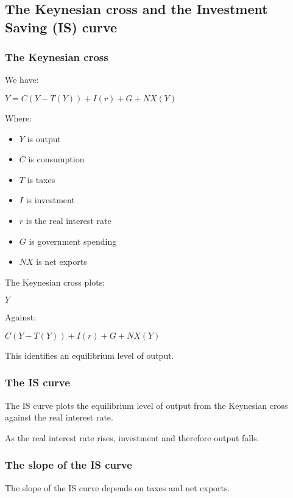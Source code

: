 
\subsection{The Keynesian cross and the Investment Saving (IS) curve}

\subsubsection{The Keynesian cross}

We have:

\(Y=C(Y-T(Y))+I(r)+G+NX(Y)\)

Where:

\begin{itemize}
\item \(Y\) is output
\item \(C\) is consumption
\item \(T\) is taxes
\item \(I\) is investment
\item \(r\) is the real interest rate
\item \(G\) is government spending
\item \(NX\) is net exports
\end{itemize}

The Keynesian cross plots:

\(Y\)

Against:

\(C(Y-T(Y))+I(r)+G+NX(Y)\)

This identifies an equilibrium level of output.

\subsubsection{The IS curve}

The IS curve plots the equilibrium level of output from the Keynesian cross against the real interest rate.

As the real interest rate rises, investment and therefore output falls.

\subsubsection{The slope of the IS curve}

The slope of the IS curve depends on taxes and net exports.

